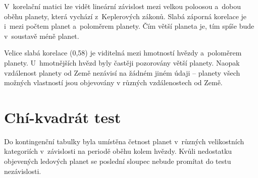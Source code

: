 \documentclass[a4paper,12pt]{article}
\begin{document}
V~korelační matici lze vidět lineární závislost mezi velkou poloosou a~dobou oběhu planety, která vychází z~Keplerových zákonů. Slabá záporná korelace je i~mezi počtem planet a~poloměrem planety. Čím větší planeta je, tím spíše bude v~soustavě méně planet.

Velice slabá korelace (0,58) je viditelná mezi hmotností hvězdy a~poloměrem planety. U~hmotnějších hvězd byly častěji pozorovány větší planety. Naopak vzdálenost planety od Země nezávisí na žádném jiném údaji -- planety všech možných vlastností jsou objevovány v různých vzdálenostech od Země.

\section{Chí-kvadrát test}


Do kontingenční tabulky byla umístěna četnost planet v~různých velikostních kategoriích v~závislosti na periodě oběhu kolem hvězdy. Kvůli nedostatku objevených ledových planet se poslední sloupec nebude promítat do testu nezávislosti.
\end{document}

